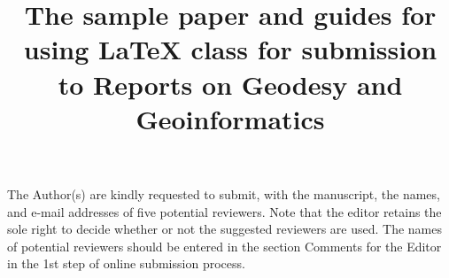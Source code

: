 \documentclass{rog}
\title{The sample paper and guides for using \LaTeX{} class for submission to Reports on Geodesy and Geoinformatics}
\begin{document}
    \maketitle
    The Author(s) are kindly requested to submit, with the manuscript, the names, and e-mail addresses of five potential reviewers. Note that the editor retains the sole right to decide whether or not the suggested reviewers are used. The names of potential reviewers should be entered in the section Comments for the Editor in the 1st step of online submission process.
\cite{hw1997}
\end{document}
